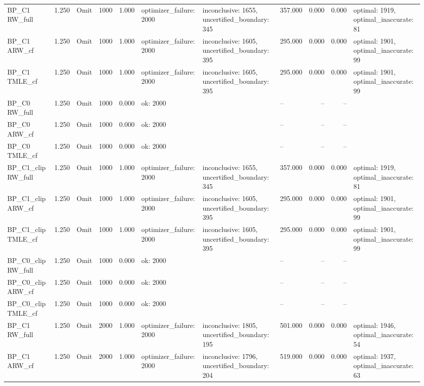 \begin{tabular}{llllrlllrrl}
BP\_C1 RW\_full & 1.250 & Omit & 1000 & 1.000 & optimizer\_failure: 2000 & inconclusive: 1655, uncertified\_boundary: 345 & 357.000 & 0.000 & 0.000 & optimal: 1919, optimal\_inaccurate: 81 \\
BP\_C1 ARW\_cf & 1.250 & Omit & 1000 & 1.000 & optimizer\_failure: 2000 & inconclusive: 1605, uncertified\_boundary: 395 & 295.000 & 0.000 & 0.000 & optimal: 1901, optimal\_inaccurate: 99 \\
BP\_C1 TMLE\_cf & 1.250 & Omit & 1000 & 1.000 & optimizer\_failure: 2000 & inconclusive: 1605, uncertified\_boundary: 395 & 295.000 & 0.000 & 0.000 & optimal: 1901, optimal\_inaccurate: 99 \\
BP\_C0 RW\_full & 1.250 & Omit & 1000 & 0.000 & ok: 2000 &  & -- & -- & -- &  \\
BP\_C0 ARW\_cf & 1.250 & Omit & 1000 & 0.000 & ok: 2000 &  & -- & -- & -- &  \\
BP\_C0 TMLE\_cf & 1.250 & Omit & 1000 & 0.000 & ok: 2000 &  & -- & -- & -- &  \\
BP\_C1\_clip RW\_full & 1.250 & Omit & 1000 & 1.000 & optimizer\_failure: 2000 & inconclusive: 1655, uncertified\_boundary: 345 & 357.000 & 0.000 & 0.000 & optimal: 1919, optimal\_inaccurate: 81 \\
BP\_C1\_clip ARW\_cf & 1.250 & Omit & 1000 & 1.000 & optimizer\_failure: 2000 & inconclusive: 1605, uncertified\_boundary: 395 & 295.000 & 0.000 & 0.000 & optimal: 1901, optimal\_inaccurate: 99 \\
BP\_C1\_clip TMLE\_cf & 1.250 & Omit & 1000 & 1.000 & optimizer\_failure: 2000 & inconclusive: 1605, uncertified\_boundary: 395 & 295.000 & 0.000 & 0.000 & optimal: 1901, optimal\_inaccurate: 99 \\
BP\_C0\_clip RW\_full & 1.250 & Omit & 1000 & 0.000 & ok: 2000 &  & -- & -- & -- &  \\
BP\_C0\_clip ARW\_cf & 1.250 & Omit & 1000 & 0.000 & ok: 2000 &  & -- & -- & -- &  \\
BP\_C0\_clip TMLE\_cf & 1.250 & Omit & 1000 & 0.000 & ok: 2000 &  & -- & -- & -- &  \\
BP\_C1 RW\_full & 1.250 & Omit & 2000 & 1.000 & optimizer\_failure: 2000 & inconclusive: 1805, uncertified\_boundary: 195 & 501.000 & 0.000 & 0.000 & optimal: 1946, optimal\_inaccurate: 54 \\
BP\_C1 ARW\_cf & 1.250 & Omit & 2000 & 1.000 & optimizer\_failure: 2000 & inconclusive: 1796, uncertified\_boundary: 204 & 519.000 & 0.000 & 0.000 & optimal: 1937, optimal\_inaccurate: 63 \\

\end{tabular}
